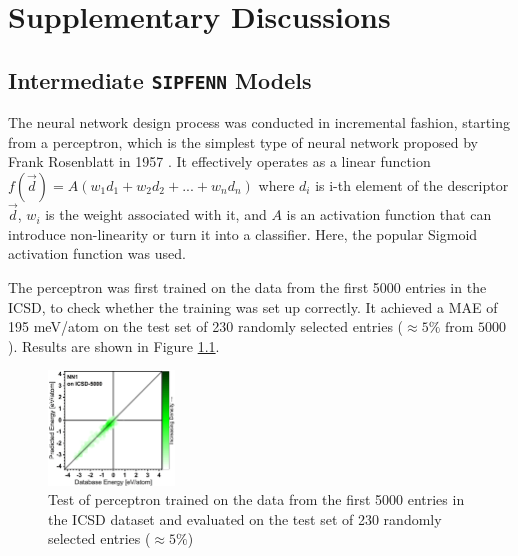 \chapter{Supplementary Discussions} \label{chap:supdiscussions}

\section{Intermediate \texttt{SIPFENN} Models} \label{sipfenn:appendix2}

The neural network design process was conducted in incremental fashion, starting from a perceptron, which is the simplest type of neural network proposed by Frank Rosenblatt in 1957 \cite{Rosenblatt1957TheAutomaton}. It effectively operates as a linear function $f(\vec{d}) = A(w_1 d_1 + w_2 d_2 + ... + w_n d_n)$ where $d_i$ is i-th element of the descriptor $\vec{d}$, $w_i$ is the weight associated with it, and $A$ is an activation function that can introduce non-linearity or turn it into a classifier. Here, the popular Sigmoid activation function was used. 

The perceptron was first trained on the data from the first 5000 entries in the ICSD, to check whether the training was set up correctly. It achieved a MAE of 195 meV/atom on the test set of 230 randomly selected entries ($\approx 5\% \text{ from } 5000$). Results are shown in Figure \ref{sipfenn:fig:nn1performance}. 

\begin{figure}[H]
    \centering
    \includegraphics[width=0.3\textwidth]{sipfenn/NN1_test.png}
    \caption{Test of perceptron trained on the data from the first 5000 entries in the ICSD dataset and evaluated on the test set of 230 randomly selected entries ($\approx5\%$)}
    \label{sipfenn:fig:nn1performance}
\end{figure}

